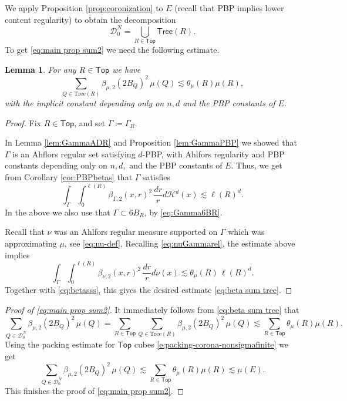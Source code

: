 \documentclass[11pt,reqno]{amsart}
\newcommand{\Top}{\mathsf{Top}}
\newcommand{\Tr}{\mathrm{Tree}}
\newcommand{\Tree}{\mathsf{Tree}}
\newcommand{\fr}[2]{\frac{#1}{#2}}
\newtheorem{lemma}[theorem]{Lemma}
\theoremstyle{definition}
\theoremstyle{remark}
\numberwithin{equation}{section}
\newcommand{\hd}{\mathcal{H}^d}
\newcommand{\DD}{\mathcal{D}}
\theoremstyle{theorem}
\theoremstyle{definition}
\theoremstyle{remark}
\numberwithin{equation}{section}
\begin{document}

 We apply Proposition \ref{prop:coronization} to $E$ (recall that PBP implies lower content regularity) to obtain the decomposition
 \begin{equation*}
     \DD_0^N=\bigcup_{R\in\Top}\Tree(R).
 \end{equation*}
 To get \eqref{eq:main prop sum2} we need the following estimate.
	\begin{lemma}\label{lem:key lemma}
		For any $R\in\Top$ we have
		\begin{equation}\label{eq:beta sum tree}
			\sum_{Q\in\Tr(R)}\beta_{\mu,2}(2B_Q)^2\,\mu(Q)\lesssim \theta_\mu(R)\mu(R),
		\end{equation}
		with the implicit constant depending only on $n,d$ and the PBP constants of $E$.
	\end{lemma}
    \begin{proof}
        Fix $R\in\Top$, and set $\Gamma\coloneqq \Gamma_R.$
    
    In Lemma \ref{lem:GammaADR} and Proposition \ref{lem:GammaPBP} we showed that $\Gamma$ is an Ahflors regular set satisfying $d$-PBP, with Ahlfors regularity and PBP constants depending only on $n, d,$ and the PBP constants of $E$. Thus, we get from Corollary \ref{cor:PBPbetas} that $\Gamma$ satisfies
	\begin{equation*}
	\int_{\Gamma}\int_0^{\ell(R)} \beta_{\Gamma,2}(x,r)^2\, \fr{dr}{r}d\hd(x)\lesssim \ell(R)^d.
	\end{equation*}
	In the above we also use that $\Gamma\subset 6B_R$, by \eqref{eq:Gamma6BR}.

    Recall that $\nu$ was an Ahlfors regular measure supported on $\Gamma$ which was approximating $\mu$, see \eqref{eq:nu-def}.
	Recalling \eqref{eq:nuGammarel}, the estimate above implies
	\begin{equation*}
	\int_{\Gamma}\int_0^{\ell(R)} \beta_{\nu,2}(x,r)^2\, \fr{dr}{r}d\nu(x)\lesssim \theta_\mu(R)\,\ell(R)^d.
	\end{equation*}
	Together with \eqref{eq:betasss}, this gives the desired estimate \eqref{eq:beta sum tree}.
	\end{proof}

	\begin{proof}[Proof of \eqref{eq:main prop sum2}]
		It immediately follows from \eqref{eq:beta sum tree} that
		\begin{equation*}
			\sum_{Q\in\DD_0^N}\beta_{\mu,2}(2B_Q)^2\,\mu(Q) = \sum_{R\in\Top}\sum_{Q\in\Tr(R)}\beta_{\mu,2}(2B_Q)^2\,\mu(Q)
			\lesssim \sum_{R\in\Top}\theta_\mu(R)\mu(R).
		\end{equation*}
Using the packing estimate for $\Top$ cubes \eqref{e:packing-corona-nonsigmafinite} we get
	\begin{equation*}
		\sum_{Q\in\DD_0^N}\beta_{\mu,2}(2B_Q)^2\,\mu(Q)\lesssim \sum_{R\in\Top}\theta_\mu(R)\mu(R)\lesssim
  \mu(E).
	\end{equation*}
	This finishes the proof of \eqref{eq:main prop sum2}.
 \end{proof}
    
\end{document}
